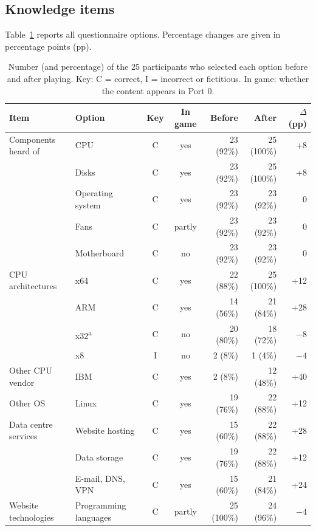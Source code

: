 \documentclass[runningheads]{llncs}
\begin{document}
\subsection{Knowledge items}

Table~\ref{Tab:Lean} reports all questionnaire options. Percentage changes are given in percentage points (pp).

\begin{table}[htbp]
    \centering
    \caption{Number (and percentage) of the 25 participants who selected each option before and after playing. Key: C = correct, I = incorrect or fictitious. In game: whether the content appears in Port 0.}
    \label{Tab:Lean}
    \scriptsize
    \begin{tabular}{@{}llccrrr@{}}
        \toprule
        \textbf{Item} & \textbf{Option} & \textbf{Key} & \textbf{In game} & \textbf{Before} & \textbf{After} & \textbf{$\Delta$ (pp)} \\ \midrule
        Components heard of & CPU & C & yes & 23 (92\%) & 25 (100\%) & +8 \\
         & Disks & C & yes & 23 (92\%) & 25 (100\%) & +8 \\
         & Operating system & C & yes & 23 (92\%) & 23 (92\%) & 0 \\
         & Fans & C & partly & 23 (92\%) & 23 (92\%) & 0 \\
         & Motherboard & C & no & 23 (92\%) & 23 (92\%) & 0 \\ \midrule
        CPU architectures & x64 & C & yes & 22 (88\%) & 25 (100\%) & +12 \\
         & ARM & C & yes & 14 (56\%) & 21 (84\%) & +28 \\
         & x32\textsuperscript{a} & C & no & 20 (80\%) & 18 (72\%) & $-8$ \\
         & x8 & I & no & 2 (8\%) & 1 (4\%) & $-4$ \\ \midrule
        Other CPU vendor & IBM & C & yes & 2 (8\%) & 12 (48\%) & +40 \\
        Other OS & Linux & C & yes & 19 (76\%) & 22 (88\%) & +12 \\ \midrule
        Data centre services & Website hosting & C & yes & 15 (60\%) & 22 (88\%) & +28 \\
         & Data storage & C & yes & 19 (76\%) & 22 (88\%) & +12 \\
         & E-mail, DNS, VPN & C & yes & 15 (60\%) & 21 (84\%) & +24 \\ \midrule
        Website technologies & Programming languages & C & partly & 25 (100\%) & 24 (96\%) & $-4$ \\

\end{tabular}
\end{table}
\end{document}
